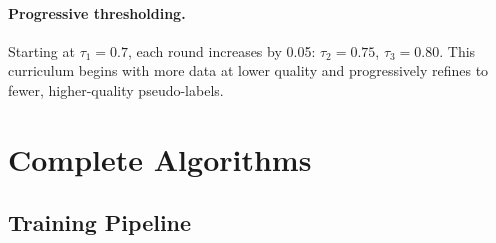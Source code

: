 \documentclass[10pt,twocolumn,letterpaper]{article}
\begin{document}
\paragraph{Progressive thresholding.}
Starting at $\tau_1 = 0.7$, each round increases by 0.05: $\tau_2 = 0.75$, $\tau_3 = 0.80$. This curriculum begins with more data at lower quality and progressively refines to fewer, higher-quality pseudo-labels.


\section{Complete Algorithms}
\label{sec:supp_algorithms}

\subsection{Training Pipeline}
\end{document}
